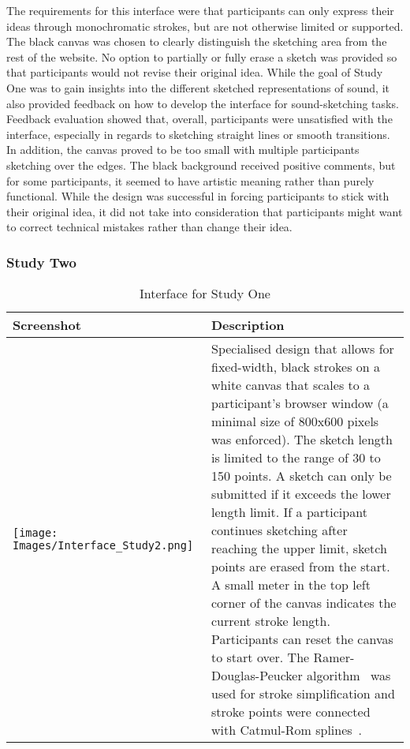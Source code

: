 \documentclass[]{interact}
\theoremstyle{plain}%
\theoremstyle{definition}
\theoremstyle{remark}
\begin{document}
The requirements for this interface were that participants can only express their ideas through monochromatic strokes, but are not otherwise limited or supported. The black canvas was chosen to clearly distinguish the sketching area from the rest of the website. No option to partially or fully erase a sketch was provided so that participants would not revise their original idea. While the goal of Study One was to gain insights into the different sketched representations of sound, it also provided feedback on how to develop the interface for sound-sketching tasks. Feedback evaluation showed that, overall, participants were unsatisfied with the interface, especially in regards to sketching straight lines or smooth transitions. In addition, the canvas proved to be too small with multiple participants sketching over the edges. The black background received positive comments, but for some participants, it seemed to have artistic meaning rather than purely functional. While the design was successful in forcing participants to stick with their original idea, it did not take into consideration that participants might want to correct technical mistakes rather than change their idea.

\subsubsection{Study Two}\label{subsubsec:interface_two}

\begin{table*}[h!]
 \begin{center}
 \begin{tabular}{|p{0.5\linewidth}|p{0.5\linewidth}|}
\hline
    \textbf{Screenshot}
        & 
    \textbf{Description}   
    \\
\hline
\vspace{0cm}
    \texttt{[image: Images/Interface\_Study2.png]}

    & 
    Specialised design that allows for fixed-width, black strokes on a white canvas that scales to a participant's browser window (a minimal size of 800x600 pixels was enforced). The sketch length is limited to the range of 30 to 150 points. A sketch can only be submitted if it exceeds the lower length limit.  If a participant continues sketching after reaching the upper limit, sketch points are erased from the start. A small meter in the top left corner of the canvas indicates the current stroke length. Participants can reset the canvas to start over. The Ramer-Douglas-Peucker algorithm~\cite{rdp} was used for stroke simplification and stroke points were connected with Catmul-Rom splines~\cite{splines}.
    \\
 \hline
\end{tabular}
\end{center}
\vspace*{-0.05in}
 \caption{Interface for Study One}
 \label{tab:interface_2_specs}
\end{table*}
\end{document}
